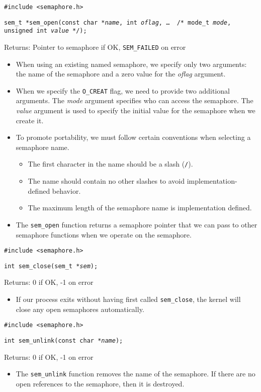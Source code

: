 \documentclass[]{article}
\newcommand{\code}{\texttt}
\begin{document}
\code{\#include <semaphore.h>}

\code{sem\_t *sem\_open(const char *\emph{name}, int \emph{oflag}, \ldots\, /*
mode\_t \emph{mode}, unsigned int \emph{value} */);}

Returns: Pointer to semaphore if OK, \code{SEM\_FAILED} on error

\begin{itemize}
\item When using an existing named semaphore, we specify only two arguments:
the name of the semaphore and a zero value for the \emph{oflag} argument.
\item When we specify the \code{O\_CREAT} flag, we need to provide two
additional arguments. The \emph{mode} argument specifies who can access the
semaphore. The \emph{value} argument is used to specify the initial value for
the semaphore when we create it.
\item To promote portability, we must follow certain conventions when selecting
a semaphore name.
\begin{itemize}
\item The first character in the name should be a slash (\code{/}).
\item The name should contain no other slashes to avoid implementation-defined
behavior.
\item The maximum length of the semaphore name is implementation defined.
\end{itemize}
\item The \code{sem\_open} function returns a semaphore pointer that we can pass
to other semaphore functions when we operate on the semaphore.
\end{itemize}

\code{\#include <semaphore.h>}

\code{int sem\_close(sem\_t *\emph{sem});}

Returns: 0 if OK, -1 on error

\begin{itemize}
\item If our process exits without having first called \code{sem\_close}, the
kernel will close any open semaphores automatically.
\end{itemize}

\code{\#include <semaphore.h>}

\code{int sem\_unlink(const char *\emph{name});}

Returns: 0 if OK, -1 on error

\begin{itemize}
\item The \code{sem\_unlink} function removes the name of the semaphore. If
there are no open references to the semaphore, then it is destroyed.
\end{itemize}
\end{document}
